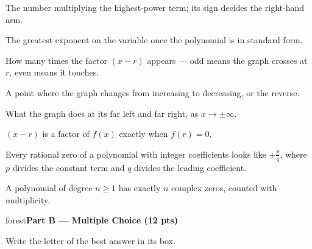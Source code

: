 \documentclass[10pt]{article}
\newcommand{\parthead}[1]{%
  \vspace{6pt}\noindent
  \begin{headlinebox}{forest}\color{white}\bfseries #1\end{headlinebox}%
  \vspace{4pt}}
\begin{document}
\hfill
\begin{minipage}[t]{0.57\textwidth}
\small
\begin{description}[leftmargin=1.4em, itemsep=3pt]
  \item[(A)] The number multiplying the highest-power term; its sign decides the right-hand arm.
  \item[(B)] The greatest exponent on the variable once the polynomial is in standard form.
  \item[(C)] How many times the factor $(x-r)$ appears --- odd means the graph crosses at $r$, even means it touches.
  \item[(D)] A point where the graph changes from increasing to decreasing, or the reverse.
  \item[(E)] What the graph does at its far left and far right, as $x\to\pm\infty$.
  \item[(F)] $(x-r)$ is a factor of $f(x)$ exactly when $f(r)=0$.
  \item[(G)] Every rational zero of a polynomial with integer coefficients looks like $\pm\frac{p}{q}$, where $p$ divides the constant term and $q$ divides the leading coefficient.
  \item[(H)] A polynomial of degree $n\ge 1$ has exactly $n$ complex zeros, counted with multiplicity.
\end{description}
\end{minipage}

\parthead{Part B --- Multiple Choice (12 pts)}
Write the letter of the best answer in its box.
\end{document}

